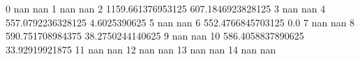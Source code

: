 0 nan nan
1 nan nan
2 1159.661376953125 607.1846923828125
3 nan nan
4 557.0792236328125 4.6025390625
5 nan nan
6 552.4766845703125 0.0
7 nan nan
8 590.751708984375 38.2750244140625
9 nan nan
10 586.4058837890625 33.92919921875
11 nan nan
12 nan nan
13 nan nan
14 nan nan
